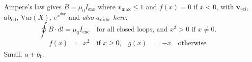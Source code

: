 \documentclass[11pt]{article}
\begin{document}
Ampere's law gives $B = \mu_0 I_{\text{enc}}$ where $x_{\text{max}} \le 1$ and $f(x) = 0 \text{ if } x<0$,
with $\textbf{v}_{\textit{rel}}$, $\mbox{ab}_{\mbox{cd}}$, $\textrm{Var}(X)$, $e^{x^{\text{tiny}}}$ and \textit{also $a_{\text{italic}}$ here}.
\[ \oint B\cdot dl = \mu_0 I_{\text{enc}} \quad\text{for all closed loops, and $x^2>0$ if } x\neq 0. \]
\begin{align}
  f(x) &= x^2 \quad \text{if $x \geq 0$}, & g(x) &= -x \quad \text{otherwise}
\end{align}
{\small Small: $\text{a} + b_{\text{b}}$.}
\end{document}

